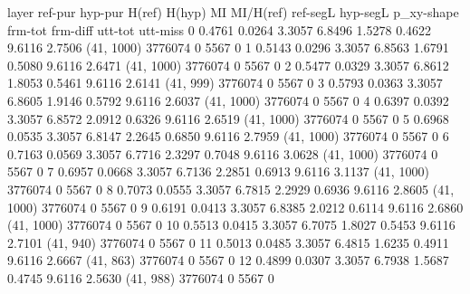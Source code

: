 layer     ref-pur    hyp-pur    H(ref)    H(hyp)      MI    MI/H(ref)    ref-segL    hyp-segL  p_xy-shape      frm-tot    frm-diff    utt-tot    utt-miss
0          0.4761     0.0264    3.3057    6.8496  1.5278       0.4622      9.6116      2.7506  (41, 1000)      3776074           0       5567           0
1          0.5143     0.0296    3.3057    6.8563  1.6791       0.5080      9.6116      2.6471  (41, 1000)      3776074           0       5567           0
2          0.5477     0.0329    3.3057    6.8612  1.8053       0.5461      9.6116      2.6141  (41, 999)       3776074           0       5567           0
3          0.5793     0.0363    3.3057    6.8605  1.9146       0.5792      9.6116      2.6037  (41, 1000)      3776074           0       5567           0
4          0.6397     0.0392    3.3057    6.8572  2.0912       0.6326      9.6116      2.6519  (41, 1000)      3776074           0       5567           0
5          0.6968     0.0535    3.3057    6.8147  2.2645       0.6850      9.6116      2.7959  (41, 1000)      3776074           0       5567           0
6          0.7163     0.0569    3.3057    6.7716  2.3297       0.7048      9.6116      3.0628  (41, 1000)      3776074           0       5567           0
7          0.6957     0.0668    3.3057    6.7136  2.2851       0.6913      9.6116      3.1137  (41, 1000)      3776074           0       5567           0
8          0.7073     0.0555    3.3057    6.7815  2.2929       0.6936      9.6116      2.8605  (41, 1000)      3776074           0       5567           0
9          0.6191     0.0413    3.3057    6.8385  2.0212       0.6114      9.6116      2.6860  (41, 1000)      3776074           0       5567           0
10         0.5513     0.0415    3.3057    6.7075  1.8027       0.5453      9.6116      2.7101  (41, 940)       3776074           0       5567           0
11         0.5013     0.0485    3.3057    6.4815  1.6235       0.4911      9.6116      2.6667  (41, 863)       3776074           0       5567           0
12         0.4899     0.0307    3.3057    6.7938  1.5687       0.4745      9.6116      2.5630  (41, 988)       3776074           0       5567           0
   